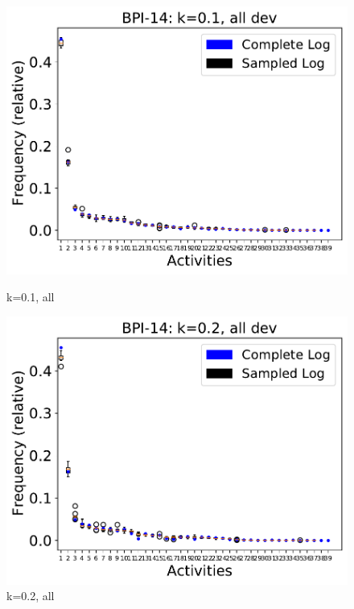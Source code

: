 \documentclass[landscape]{article}
\begin{document}
\begin{figure}[!htb]
	\centering
	\begin{minipage}{0.2\textwidth}
		\includegraphics[width=1.0\textwidth]{../Detail_Incident_Activity/Detail_Incident_Activity_deviationsApprox_0.1_NONALIGNING_ALL.pdf}
		\caption{k=0.1, all}
	\end{minipage}
	\hfill
	\begin{minipage}{0.2\textwidth}
		\includegraphics[width=1.0\textwidth]{../Detail_Incident_Activity/Detail_Incident_Activity_deviationsApprox_0.2_NONALIGNING_ALL.pdf}
		\caption{k=0.2, all}
	\end{minipage}
	\hfill

\end{figure}
\end{document}
